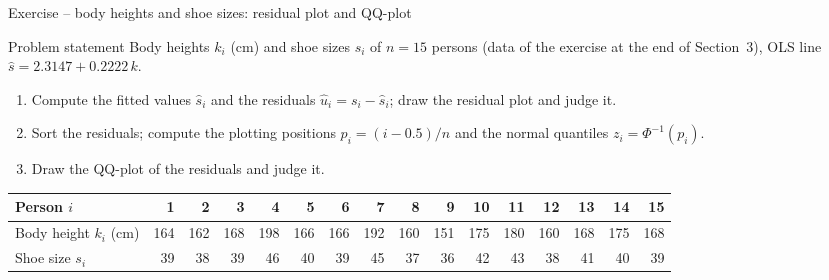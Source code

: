 \documentclass[aspectratio=169,11pt]{beamer}
\begin{document}
\begin{frame}{Exercise -- body heights and shoe sizes: residual plot and QQ-plot}
  \begin{block}{Problem statement}
    Body heights $k_i$ (cm) and shoe sizes $s_i$ of $n = 15$ persons (data of
    the exercise at the end of Section~3), OLS line
    $\hat{s} = 2.3147 + 0.2222\,k$.
    \begin{enumerate}
      \setlength{\itemsep}{2pt}
      \item Compute the fitted values $\hat{s}_i$ and the residuals
            $\hat{u}_i = s_i - \hat{s}_i$; draw the residual plot and judge it.
      \item Sort the residuals; compute the plotting positions
            $p_i = (i - 0.5)/n$ and the normal quantiles $z_i = \Phi^{-1}(p_i)$.
      \item Draw the QQ-plot of the residuals and judge it.
    \end{enumerate}
  \end{block}
  \begin{center}
    \footnotesize
    \renewcommand{\arraystretch}{1.1}
    \setlength{\tabcolsep}{3.4pt}
    \begin{tabular}{l*{15}{r}}
      \toprule
      Person $i$             & 1 & 2 & 3 & 4 & 5 & 6 & 7 & 8 & 9 & 10 & 11 & 12 & 13 & 14 & 15 \\
      \midrule
      Body height $k_i$ (cm) & 164 & 162 & 168 & 198 & 166 & 166 & 192 & 160 & 151 & 175 & 180 & 160 & 168 & 175 & 168 \\
      Shoe size $s_i$        & 39 & 38 & 39 & 46 & 40 & 39 & 45 & 37 & 36 & 42 & 43 & 38 & 41 & 40 & 39 \\
      \bottomrule
    \end{tabular}
  \end{center}
\end{frame}
\end{document}
